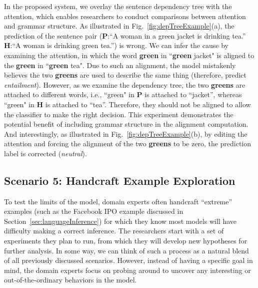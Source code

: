 In the proposed system, we overlay the sentence dependency tree with the attention, which enables researchers to conduct comparisons between attention and grammar structure.
As illustrated in Fig.~\ref{fig:depTreeExample}(a), the prediction of the sentence pair (\textbf{P}:``A woman in a green jacket is drinking tea.'' \textbf{H}:``A woman is drinking green tea.'') is wrong. We can infer the cause by examining the attention, in which the word \textbf{green} in ``\textbf{green} jacket" is aligned to the \textbf{green} in ``\textbf{green} tea". Due to such an alignment, the model mistakenly believes the two \textbf{greens} are used to describe the same thing (therefore, predict \emph{entailment}).  However, as we examine the dependency tree, the two \textbf{greens} are attached to different words, i.e., ``green" in \textbf{P} is attached to ``jacket'', whereas ``green" in \textbf{H} is attached to ``tea''. Therefore, they should not be aligned to allow the classifier to make the right decision.
%
This experiment demonstrates the potential benefit of including grammar structure in the alignment computation. %
%
And interestingly, as illustrated in Fig.~\ref{fig:depTreeExample}(b), by editing the attention and forcing the alignment of the two \textbf{greens} to be zero, the prediction label is corrected (\emph{neutral}). 

\subsection{Scenario 5: Handcraft Example Exploration}
To test the limits of the model, domain experts often handcraft ``extreme'' examples (such as the Facebook IPO example discussed in Section~\ref{sec:languageInference}) for which they know most models will have difficulty making a correct inference.
%
The researchers start with a set of experiments they plan to run, from which they will develop new hypotheses for further analysis.
%
In some way, we can think of such a process as a natural blend of all previously discussed scenarios. However, instead of having a specific goal in mind, the domain experts focus on probing around to uncover any interesting or out-of-the-ordinary behaviors in the model.
%


